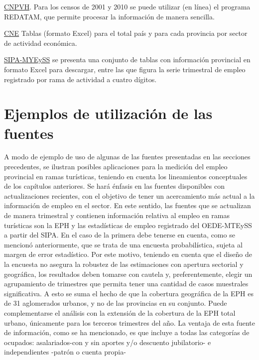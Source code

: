 \documentclass[
  openany]{book}
\begin{document}
\href{https://www.indec.gob.ar/indec/web/Nivel3-Tema-2-41}{CNPVH}. Para los censos de 2001 y 2010 se puede utilizar (en línea) el programa REDATAM, que permite procesar la información de manera sencilla.

\href{https://sitioanterior.indec.gob.ar/cne2005_index.asp}{CNE} Tablas (formato Excel) para el total país y para cada provincia por sector de actividad económica.

\href{https://www.trabajo.gob.ar/estadisticas/oede/estadisticasregionales.asp}{SIPA-MYEySS} se presenta una conjunto de tablas con información provincial en formato Excel para descargar, entre las que figura la serie trimestral de empleo registrado por rama de actividad a cuatro dígitos.

\hypertarget{ejemplos-de-utilizaciuxf3n-de-las-fuentes}{%
\section{Ejemplos de utilización de las fuentes}\label{ejemplos-de-utilizaciuxf3n-de-las-fuentes}}

A modo de ejemplo de uso de algunas de las fuentes presentadas en las secciones precedentes, se ilustran posibles aplicaciones para la medición del empleo provincial en ramas turísticas, teniendo en cuenta los lineamientos conceptuales de los capítulos anteriores. Se hará énfasis en las fuentes disponibles con actualizaciones recientes, con el objetivo de tener un acercamiento más actual a la información de empleo en el sector. En este sentido, las fuentes que se actualizan de manera trimestral y contienen información relativa al empleo en ramas turísticas son la EPH y las estadísticas de empleo registrado del OEDE-MTEySS a partir del SIPA. En el caso de la primera debe tenerse en cuenta, como se mencionó anteriormente, que se trata de una encuesta probabilística, sujeta al margen de error estadístico. Por este motivo, teniendo en cuenta que el diseño de la encuesta no asegura la robustez de las estimaciones con apertura sectorial y geográfica, los resultados deben tomarse con cautela y, preferentemente, elegir un agrupamiento de trimestres que permita tener una cantidad de casos muestrales significativa. A esto se suma el hecho de que la cobertura geográfica de la EPH es de 31 aglomerados urbanos, y no de las provincias en su conjunto. Puede complementarse el análisis con la extensión de la cobertura de la EPH total urbano, únicamente para los terceros trimestres del año. La ventaja de esta fuente de información, como se ha mencionado, es que incluye a todas las categorías de ocupados: asalariados-con y sin aportes y/o descuento jubilatorio- e independientes -patrón o cuenta propia-
\end{document}
